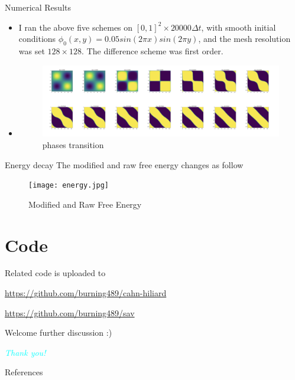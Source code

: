 \documentclass[9pt]{beamer}
\begin{document}
\begin{frame}{Numerical Results}
\begin{itemize}
\item{I ran the above five schemes on $[0,1]^2 \times 20000\Delta t $, with smooth initial conditions $\phi_0(x,y) = 0.05 sin(2\pi x)sin(2\pi y)$, and the mesh resolution was set $128\times128$. The difference scheme was first order.}
\item{
 \begin{figure}[H]
  \centering
  \includegraphics[scale=0.18]{phases/sav_phases.jpeg}
 \caption{phases transition}
 \label{fig:2}
\end{figure}
}
\end{itemize}
\end{frame}

\begin{frame}{Energy decay}
The modified and raw free energy changes as follow
 \begin{figure}[H]
  \centering
  \texttt{[image: energy.jpg]}
 \caption{Modified and Raw Free Energy}
 \label{fig:3}
\end{figure}
\end{frame}

\section{Code}

\begin{frame}
Related code is uploaded to

\url{https://github.com/burning489/cahn-hiliard} 

\url{https://github.com/burning489/sav}

Welcome further discussion :)

\end{frame}

\begin{frame}
 \begin{center}
{\huge \emph{\textcolor{cyan}{Thank you!}}}\\
\end{center}
\end{frame}

\nocite{*}
\begin{frame}[allowframebreaks]{References}
	
	
\end{frame}
\end{document}
